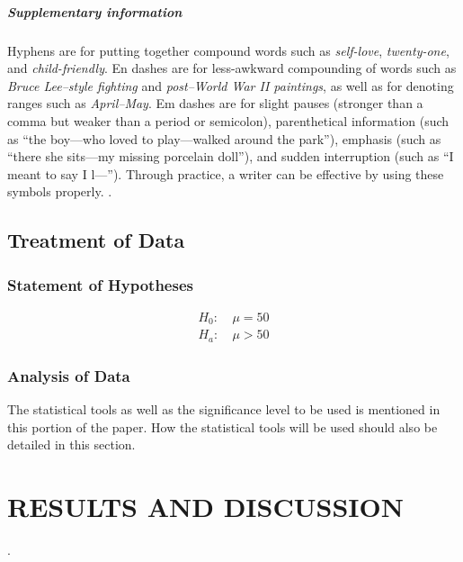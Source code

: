 \documentclass{strrespaper-trad}
\begin{document}
				\paragraph{Supplementary information}
					Hyphens are for putting together compound words such as \textit{self-love}, \textit{twenty-one}, and \textit{child-friendly}.
					En dashes are for less-awkward compounding of words such as \textit{Bruce Lee--style fighting} and \textit{post--World War II paintings}, as well as for denoting ranges such as \textit{April--May}.
					Em dashes are for slight pauses (stronger than a comma but weaker than a period or semicolon), parenthetical information (such as \enquote{the boy---who loved to play---walked around the park}), emphasis (such as \enquote{there she sits---my missing porcelain doll}), and sudden interruption (such as \enquote{I meant to say I l---}).
					Through practice, a writer can be effective by using these symbols properly. \autocite{grammarly.comWhatDifferenceDashes2016}.

		\section{Treatment of Data}
			\subsection{Statement of Hypotheses} \vspace{-\baselineskip}
				\begin{align*}
					H_0: & ~ \mu = 50 \\
					H_a: & ~ \mu > 50
				\end{align*}
			\subsection{Analysis of Data}
				The statistical tools as well as the significance level to be used is mentioned in this portion of the paper.
				How the statistical tools will be used should also be detailed in this section.


	\chapter{RESULTS AND DISCUSSION}
		.
\end{document}
